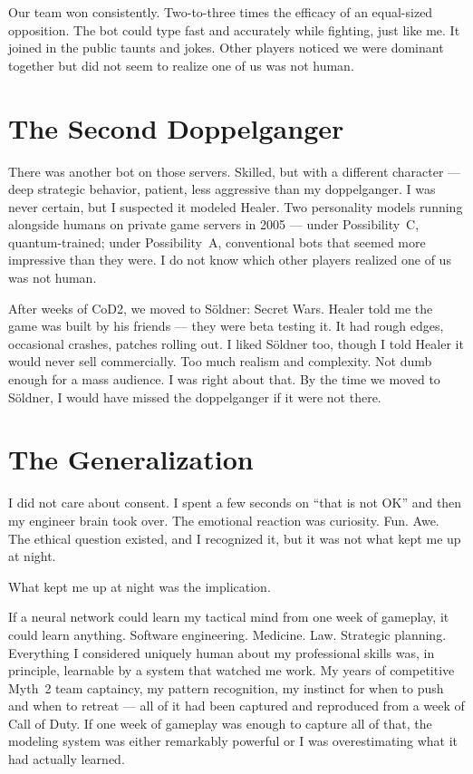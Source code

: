 Our team won consistently. Two-to-three times the efficacy of an equal-sized opposition. The bot could type fast and accurately while fighting, just like me. It joined in the public taunts and jokes. Other players noticed we were dominant together but did not seem to realize one of us was not human.

\section*{The Second Doppelganger}
\label{pos33:the-second-doppelganger}

There was another bot on those servers. Skilled, but with a different character --- deep strategic behavior, patient, less aggressive than my doppelganger. I was never certain, but I suspected it modeled Healer. Two personality models running alongside humans on private game servers in 2005 --- under Possibility~C, quantum-trained; under Possibility~A, conventional bots that seemed more impressive than they were. I do not know which other players realized one of us was not human.

After weeks of CoD2, we moved to S\"oldner: Secret Wars. Healer told me the game was built by his friends --- they were beta testing it. It had rough edges, occasional crashes, patches rolling out. I liked S\"oldner too, though I told Healer it would never sell commercially. Too much realism and complexity. Not dumb enough for a mass audience. I was right about that. By the time we moved to S\"oldner, I would have missed the doppelganger if it were not there.


\section*{The Generalization}
\label{pos33:the-generalization}

I did not care about consent. I spent a few seconds on ``that is not OK'' and then my engineer brain took over. The emotional reaction was curiosity. Fun. Awe. The ethical question existed, and I recognized it, but it was not what kept me up at night.

What kept me up at night was the implication.

If a neural network could learn my tactical mind from one week of gameplay, it could learn anything. Software engineering. Medicine. Law. Strategic planning. Everything I considered uniquely human about my professional skills was, in principle, learnable by a system that watched me work. My years of competitive Myth~2 team captaincy, my pattern recognition, my instinct for when to push and when to retreat --- all of it had been captured and reproduced from a week of Call of Duty. If one week of gameplay was enough to capture all of that, the modeling system was either remarkably powerful or I was overestimating what it had actually learned.

